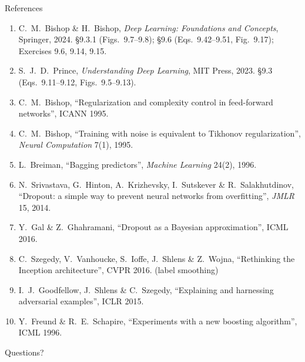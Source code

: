 \documentclass[aspectratio=169, 11pt]{beamer}
\begin{document}
\begin{frame}[allowframebreaks]{References}
  \vspace{0.3em}
  {\scriptsize
  \begin{enumerate}\itemsep0.30em
    \item C.\ M.\ Bishop \& H.\ Bishop, \emph{Deep Learning: Foundations
          and Concepts}, Springer, 2024. \S9.3.1 (Figs.~9.7--9.8);
          \S9.6 (Eqs.~9.42--9.51, Fig.~9.17); Exercises 9.6, 9.14, 9.15.
    \item S.\ J.\ D.\ Prince, \emph{Understanding Deep Learning}, MIT
          Press, 2023. \S9.3 (Eqs.~9.11--9.12, Figs.~9.5--9.13).
    \item C.\ M.\ Bishop, ``Regularization and complexity control in
          feed-forward networks'', ICANN 1995.
    \item C.\ M.\ Bishop, ``Training with noise is equivalent to
          Tikhonov regularization'', \emph{Neural Computation} 7(1),
          1995.
    \item L.\ Breiman, ``Bagging predictors'', \emph{Machine Learning}
          24(2), 1996.
    \item N.\ Srivastava, G.\ Hinton, A.\ Krizhevsky, I.\ Sutskever \&
          R.\ Salakhutdinov, ``Dropout: a simple way to prevent neural
          networks from overfitting'', \emph{JMLR} 15, 2014.
    \item Y.\ Gal \& Z.\ Ghahramani, ``Dropout as a Bayesian
          approximation'', ICML 2016.
    \item C.\ Szegedy, V.\ Vanhoucke, S.\ Ioffe, J.\ Shlens \&
          Z.\ Wojna, ``Rethinking the Inception architecture'',
          CVPR 2016. (label smoothing)
    \item I.\ J.\ Goodfellow, J.\ Shlens \& C.\ Szegedy, ``Explaining
          and harnessing adversarial examples'', ICLR 2015.
    \item Y.\ Freund \& R.\ E.\ Schapire, ``Experiments with a new
          boosting algorithm'', ICML 1996.
  \end{enumerate}}
\end{frame}

\begin{frame}[standout]
  Questions?
\end{frame}
\end{document}
